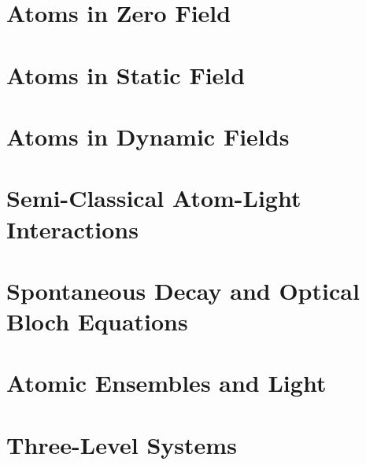 \documentclass[11pt,a4paper]{article}
\begin{document}
\section{Atoms in Zero Field}

\section{Atoms in Static Field}

\section{Atoms in Dynamic Fields}

\section{Semi-Classical Atom-Light Interactions}

\section{Spontaneous Decay and Optical Bloch Equations}

\section{Atomic Ensembles and Light}

\section{Three-Level Systems}




\end{document}
